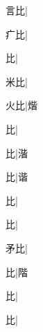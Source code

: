 \begin{multicols}{2}
{{言比}\mktsJzrVerticalBar{}{\cjk{}{\cnsym{}　}{\cnsym{}　}{\cnsym{}　}}|{}\par
{\cjk{}{\cnsym{}　}疒比}\mktsJzrVerticalBar{}{\cjk{}{\cnsym{}　}{\cnsym{}　}{\cnsym{}　}}|{}\par
{比}\mktsJzrVerticalBar{}{\cjk{}{\cnsym{}　}{\cnsym{}　}{\cnsym{}　}}|{}\par
{\cjk{}{\cnsym{}　}米比}\mktsJzrVerticalBar{}{\cjk{}{\cnsym{}　}{\cnsym{}　}{\cnsym{}　}}|{}\par
{\cjk{}{\cnsym{}　}火比}\mktsJzrVerticalBar{}{\cjk{}{\cnsym{}　}{\cnsym{}　}{\cnsym{}　}}|{\cjk{}煯}\par
{比}\mktsJzrVerticalBar{}{\cjk{}{\cnsym{}　}{\cnsym{}　}{\cnsym{}　}}|{}\par
{比}\mktsJzrVerticalBar{}{\cjk{}{\cnsym{}　}{\cnsym{}　}{\cnsym{}　}}|{\cjk{}湝}\par
{比}\mktsJzrVerticalBar{}{\cjk{}{\cnsym{}　}{\cnsym{}　}{\cnsym{}　}}|{\cjk{}谐}\par
{比}\mktsJzrVerticalBar{}{\cjk{}{\cnsym{}　}{\cnsym{}　}{\cnsym{}　}}|{}\par
{比}\mktsJzrVerticalBar{}{\cjk{}{\cnsym{}　}{\cnsym{}　}{\cnsym{}　}}|{}\par
{\cjk{}{\cnsym{}　}矛比}\mktsJzrVerticalBar{}{\cjk{}{\cnsym{}　}{\cnsym{}　}{\cnsym{}　}}|{}\par
{比}\mktsJzrVerticalBar{}{\cjk{}{\cnsym{}　}{\cnsym{}　}{\cnsym{}　}}|{\cjk{}階}\par
{比}\mktsJzrVerticalBar{}{\cjk{}{\cnsym{}　}{\cnsym{}　}{\cnsym{}　}}|{}\par
{比}\mktsJzrVerticalBar{}{\cjk{}{\cnsym{}　}{\cnsym{}　}{\cnsym{}　}}|{}\par
}
\end{multicols}
